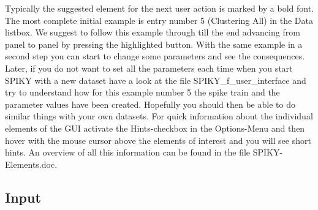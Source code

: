 \documentclass[10pt,twocolumn]{elsart5p}
\begin{document}
Typically the suggested element for the next user action is marked by a bold font. The most complete initial example is entry number 5 (Clustering All) in the Data listbox. We suggest to follow this example through till the end advancing from panel to panel by pressing the highlighted button. With the same example in a second step you can start to change some parameters and see the consequences. Later, if you do not want to set all the parameters each time when you start SPIKY with a new dataset have a look at the file SPIKY\_f\_user\_interface and try to understand how for this example number 5 the spike train and the parameter values have been created. Hopefully you should then be able to do similar things with your own datasets. For quick information about the individual elements of the GUI activate the Hints-checkbox in the Options-Menu and then hover with the mouse cursor above the elements of interest and you will see short hints. An overview of all this information can be found in the file SPIKY-Elements.doc.

\subsection{\label{ss:Input} Input}
\end{document}

